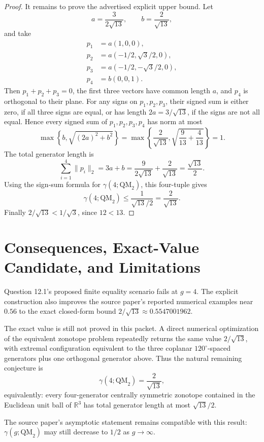 \documentclass[11pt]{article}
\begin{document}
\begin{proof}
It remains to prove the advertised explicit upper bound.  Let
\[
a=\frac{3}{2\sqrt{13}},\qquad b=\frac{2}{\sqrt{13}},
\]
and take
\[
\begin{aligned}
p_1&=a(1,0,0),\\
p_2&=a(-1/2,\sqrt3/2,0),\\
p_3&=a(-1/2,-\sqrt3/2,0),\\
p_4&=b(0,0,1).
\end{aligned}
\]
Then \(p_1+p_2+p_3=0\), the first three vectors have common length \(a\), and \(p_4\) is
orthogonal to their plane.  For any signs on \(p_1,p_2,p_3\), their signed sum is either
zero, if all three signs are equal, or has length \(2a=3/\sqrt{13}\), if the signs are not
all equal.  Hence every signed sum of \(p_1,p_2,p_3,p_4\) has norm at most
\[
\max\left\{b,\sqrt{(2a)^2+b^2}\right\}
=\max\left\{\frac2{\sqrt{13}},\sqrt{\frac9{13}+\frac4{13}}\right\}=1.
\]
The total generator length is
\[
\sum_{i=1}^4\|p_i\|_2=3a+b
=\frac{9}{2\sqrt{13}}+\frac{2}{\sqrt{13}}
=\frac{\sqrt{13}}{2}.
\]
Using the sign-sum formula for \(\gamma(4;\mathrm{QM}_2)\), this four-tuple gives
\[
\gamma(4;\mathrm{QM}_2)\leq
\frac{1}{\sqrt{13}/2}=\frac{2}{\sqrt{13}}.
\]
Finally \(2/\sqrt{13}<1/\sqrt3\), since \(12<13\).
\end{proof}

\section*{Consequences, Exact-Value Candidate, and Limitations}

Question 12.1's proposed finite equality scenario fails at \(g=4\).  The explicit construction
also improves the source paper's reported numerical examples near \(0.56\) to the exact
closed-form bound \(2/\sqrt{13}\approx 0.5547001962\).

The exact value is still not proved in this packet.  A direct numerical optimization of the
equivalent zonotope problem repeatedly returns the same value \(2/\sqrt{13}\), with extremal
configuration equivalent to the three coplanar \(120^\circ\)-spaced generators plus one
orthogonal generator above.  Thus the natural remaining conjecture is
\[
\gamma(4;\mathrm{QM}_2)=\frac{2}{\sqrt{13}},
\]
equivalently: every four-generator centrally symmetric zonotope contained in the Euclidean
unit ball of \(\mathbb R^3\) has total generator length at most \(\sqrt{13}/2\).

The source paper's asymptotic statement remains compatible with this result:
\(\gamma(g;\mathrm{QM}_2)\) may still decrease to \(1/2\) as \(g\to\infty\).
\end{document}
